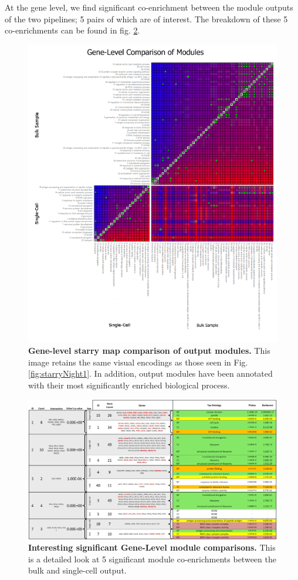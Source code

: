 \documentclass[10pt,letterpaper]{article}
\begin{document}
At the gene level, we find significant co-enrichment between the module outputs of the two pipelines; 5 pairs of which are of interest. The breakdown of these 5 co-enrichments can be found in fig. \ref{fig:geneLevelChart}.

\begin{figure}[h]
\centering
\includegraphics[width=125mm]{Figures/moduleCompareStaryMap2}
\caption{\textbf{Gene-level starry map comparison of output modules.} This image retains the same visual encodings as those seen in Fig. \ref{fig:starryNight1}. In addition, output modules have been annotated with their most significantly enriched biological process.}
\label{fig:starryMap2}
\end{figure}

\begin{figure}
\centering
\includegraphics[width=180mm]{Figures/PopVsSCGeneLevel}
\caption{\textbf{Interesting significant Gene-Level module comparisons.} This is a detailed look at 5 significant module co-enrichments between the bulk and single-cell output.}
\label{fig:geneLevelChart}
\end{figure}
\end{document}
